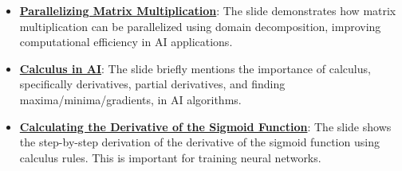 \documentclass{article}%
\begin{document}
\begin{itemize}[leftmargin=*]
\item \href{https://purdue.brightspace.com/d2l/common/assets/pdfjs-d2l-dist/1.0.14-legacy/web/viewer.html?file=%2Fcontent%2Fenforced%2F1095467-wl.202510.CS.24300.001%2F04L1-Linear Algebra Primer.pdf%3Fou%3D1095467&lang=en-us&container=d2l-fileviewer-rendered-pdf&fullscreen=d2l-fileviewer-rendered-pdf-dialog&height=667#page=18}{\textbf{Parallelizing Matrix Multiplication}}: The slide demonstrates how matrix multiplication can be parallelized using domain decomposition, improving computational efficiency in AI applications.%
\item \href{https://purdue.brightspace.com/d2l/common/assets/pdfjs-d2l-dist/1.0.14-legacy/web/viewer.html?file=%2Fcontent%2Fenforced%2F1095467-wl.202510.CS.24300.001%2F04L1-Linear Algebra Primer.pdf%3Fou%3D1095467&lang=en-us&container=d2l-fileviewer-rendered-pdf&fullscreen=d2l-fileviewer-rendered-pdf-dialog&height=667#page=19}{\textbf{Calculus in AI}}: The slide briefly mentions the importance of calculus, specifically derivatives, partial derivatives, and finding maxima/minima/gradients, in AI algorithms.%
\item \href{https://purdue.brightspace.com/d2l/common/assets/pdfjs-d2l-dist/1.0.14-legacy/web/viewer.html?file=%2Fcontent%2Fenforced%2F1095467-wl.202510.CS.24300.001%2F04L1-Linear Algebra Primer.pdf%3Fou%3D1095467&lang=en-us&container=d2l-fileviewer-rendered-pdf&fullscreen=d2l-fileviewer-rendered-pdf-dialog&height=667#page=21}{\textbf{Calculating the Derivative of the Sigmoid Function}}: The slide shows the step-by-step derivation of the derivative of the sigmoid function using calculus rules. This is important for training neural networks.%
\end{itemize}%
\end{document}
